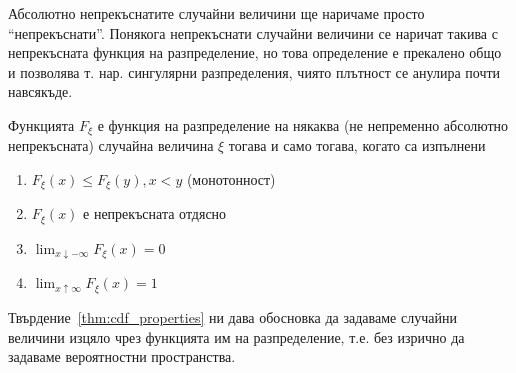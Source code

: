 \documentclass[numbers=endperiod, bibliography=totocnumbered]{scrartcl}
\begin{document}
\begin{remark}
  Абсолютно непрекъснатите случайни величини ще наричаме просто \enquote{непрекъснати}. Понякога непрекъснати случайни величини се наричат такива с непрекъсната функция на разпределение, но това определение е прекалено общо и позволява т. нар. сингулярни разпределения, чиято плътност се анулира почти навсякъде.
\end{remark}

\begin{proposition}\label{thm:cdf_properties}
  Функцията \( F_\xi \) е функция на разпределение на някаква (не непременно абсолютно непрекъсната) случайна величина \( \xi \) тогава и само тогава, когато са изпълнени
  \begin{enumerate}
    \item \( F_\xi(x) \leq F_\xi(y), x < y \) (монотонност)
    \item \( F_\xi(x) \) е непрекъсната отдясно
    \item \( \lim_{x \downarrow -\infty} F_\xi(x) = 0 \)
    \item \( \lim_{x \uparrow \infty} F_\xi(x) = 1 \)
  \end{enumerate}
\end{proposition}

Твърдение~\ref{thm:cdf_properties} ни дава обосновка да задаваме случайни величини изцяло чрез функцията им на разпределение, т.е. без изрично да задаваме вероятностни пространства.
\end{document}
